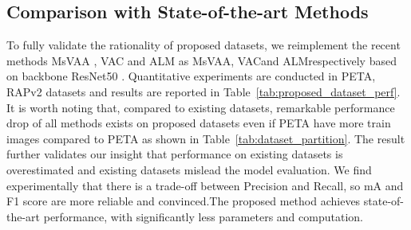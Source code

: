 \documentclass[runningheads]{llncs}
\begin{document}
\subsection{Comparison with State-of-the-art Methods}

 To fully validate the rationality of proposed datasets, we reimplement the recent methods MsVAA \cite{sarafianos2018deep}, VAC \cite{guo2019visual} and ALM \cite{tang2019Improving} as MsVAA\footnotemark[1], VAC\footnotemark[1] and ALM\footnotemark[1] respectively based on backbone ResNet50 \cite{he2016deep} . Quantitative experiments are conducted in PETA\textsubscript{}, RAPv2\textsubscript{} datasets and results are reported in Table~\ref{tab:proposed_dataset_perf}. 
It is worth noting that, compared to existing datasets, remarkable performance drop of all methods exists on proposed datasets even if PETA\textsubscript{} have more train images compared to PETA as shown in Table~\ref{tab:dataset_partition}. The result further validates our insight that performance on existing datasets is overestimated and existing datasets mislead the model evaluation. We find experimentally that there is a trade-off between Precision and Recall, so mA and F1 score are more reliable and convinced.The proposed method achieves state-of-the-art performance, with significantly less parameters and computation.
\end{document}
